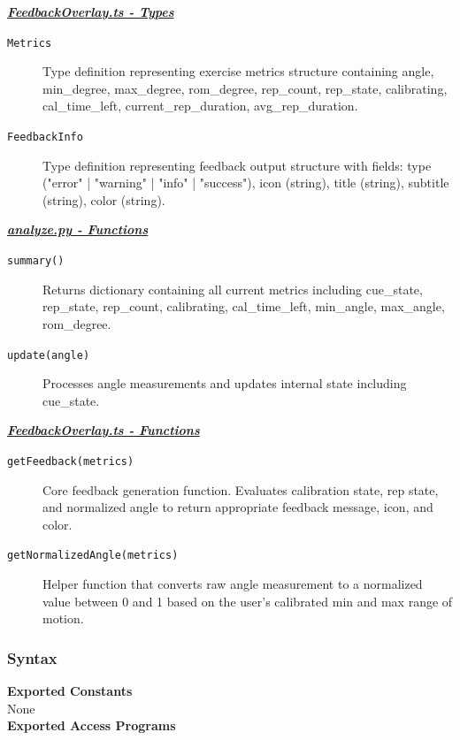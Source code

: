 \documentclass[12pt, titlepage]{article}
\begin{document}
\noindent \underline{\textbf{\textit{FeedbackOverlay.ts - Types}}}
\begin{description}
\item[\texttt{Metrics}] 
    Type definition representing exercise metrics structure containing angle, min\_degree, max\_degree, rom\_degree, rep\_count, rep\_state, calibrating, cal\_time\_left, current\_rep\_duration, avg\_rep\_duration.

\item[\texttt{FeedbackInfo}] 
    Type definition representing feedback output structure with fields: type ("error" | "warning" | "info" | "success"), icon (string), title (string), subtitle (string), color (string).
\end{description}
\noindent \underline{\textbf{\textit{analyze.py - Functions}}}
\begin{description}
\item[\texttt{summary()}] 
    Returns dictionary containing all current metrics including cue\_state, rep\_state, rep\_count, calibrating, cal\_time\_left, min\_angle, max\_angle, rom\_degree.

\item[\texttt{update(angle)}] 
    Processes angle measurements and updates internal state including cue\_state.
\end{description}
\noindent \underline{\textbf{\textit{FeedbackOverlay.ts - Functions}}}
\begin{description}
\item[\texttt{getFeedback(metrics)}] 
    Core feedback generation function. Evaluates calibration state, rep state, and normalized angle to return appropriate feedback message, icon, and color.

\item[\texttt{getNormalizedAngle(metrics)}] 
    Helper function that converts raw angle measurement to a normalized value between 0 and 1 based on the user's calibrated min and max range of motion.
\end{description}

\subsubsection{Syntax}
\textbf{Exported Constants} \\
None\\

\noindent \textbf{Exported Access Programs}\\
\end{document}
